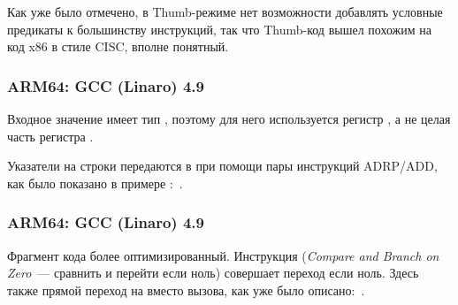 Как уже было отмечено, в Thumb-режиме нет возможности добавлять условные предикаты к большинству инструкций,
так что Thumb-код вышел похожим на код x86 в стиле \ac{CISC}, вполне понятный.

\subsubsection{ARM64: \NonOptimizing GCC (Linaro) 4.9}



Входное значение имеет тип \Tint, поэтому для него используется регистр ,
а не целая часть регистра .

Указатели на строки передаются в \puts при помощи пары инструкций ADRP/ADD, как было показано в примере
\q{\HelloWorldSectionName}:~.

\subsubsection{ARM64: \Optimizing GCC (Linaro) 4.9}



Фрагмент кода более оптимизированный.
Инструкция  (\emph{Compare and Branch on Zero}~--- сравнить и перейти если ноль) совершает переход если  ноль.
Здесь также прямой переход на \puts вместо вызова, как уже было описано:~.

